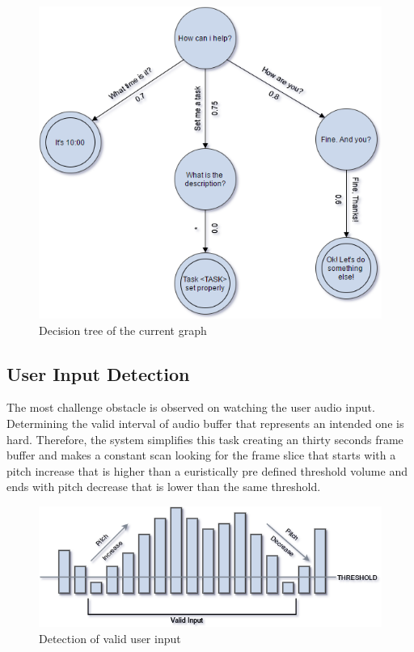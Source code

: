 \documentclass[
	article,			%
	11pt,				%
	oneside,			%
	a4paper,			%
	english,			%
	english,				%
	]{abntex2}
\begin{document}
\begin{figure}[H]
    \caption[english]{Decision tree of the current graph}
    \centering
    \includegraphics[width=\textwidth]{DecisionTree}
\end{figure}

\subsection{User Input Detection}

The most challenge obstacle is observed on watching the user audio input. Determining the valid interval
of audio buffer that represents an intended one is hard. Therefore, the system simplifies this task
creating an thirty seconds frame buffer and makes a constant scan looking for the frame slice that
starts with a pitch increase that is higher than a euristically pre defined threshold volume and ends
with pitch decrease that is lower than the same threshold.

\begin{figure}[H]
    \caption[english]{Detection of valid user input}
    \centering
    \includegraphics[width=\textwidth]{AudioBufferFrameSlice}
\end{figure}
\end{document}
